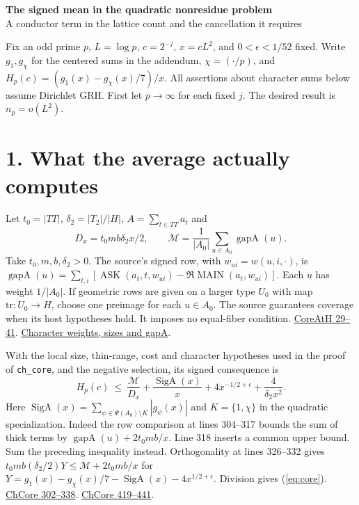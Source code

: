 \documentclass[11pt]{article}
\newcommand{\base}{https://github.com/Deicyde/riemann-hypothesis/blob/e7c8972c701d3396947808ab20cc16dc14623d33/src/}
\newcommand{\pin}[3]{\href{\base#1.lean\##2}{#3}}
\newcommand{\landdir}{Development/AutomorphicArithmetic/DedekindLFunctions/LandauTheorems/}
\newcommand{\gap}{\operatorname{gapA}}
\newcommand{\Sig}{\operatorname{SigA}}
\newcommand{\Ask}{\operatorname{ASK}}
\newcommand{\Main}{\operatorname{MAIN}}
\begin{document}
{\Large\bfseries The signed mean in the quadratic nonresidue problem}\\[3pt]
{\large A conductor term in the lattice count and the cancellation it requires}

Fix an odd prime $p$, $L=\log p$, $c=2^{-j}$, $x=cL^2$, and $0<\epsilon<1/52$ fixed.
Write $g_1,g_{\chi}$ for the centered sums in the addendum, $\chi=(\cdot/p)$, and
$H_p(c)=(g_1(x)-g_{\chi}(x)/7)/x$.
All assertions about character sums below assume Dirichlet GRH.
First let $p\to\infty$ for each fixed $j$. The desired result is $n_p=o(L^2)$.

\section*{1. What the average actually computes}
Let $t_0=|TT|$, $\delta_2=|T_2|/|H|$, $A=\sum_{t\in TT}a_t$ and
\[
 D_x=t_0mb\delta_2 x/2,\qquad
 \mathcal M=\frac{1}{|A_0|}\sum_{u\in A_0}\gap(u).
\]
Take $t_0,m,b,\delta_2>0$. The source's signed row, with $w_{ui}=w(u,i,\cdot)$, is
$\gap(u)=\sum_{t,i}[\Ask(a_t,t,w_{ui})-\Re\Main(a_t,w_{ui})]$.
Each $u$ has weight $1/|A_0|$. If geometric rows are given on a larger type $U_0$
with map $\mathrm{tr}:U_0\to H$, choose one preimage for each $u\in A_0$.
The source guarantees coverage when its host hypotheses hold. It imposes no equal-fiber condition.
\pin{Development/AutomorphicArithmetic/PrimitiveCosets/CoreAtH}{L29-L41}{CoreAtH 29--41}.
\pin{Development/AutomorphicArithmetic/DedekindLFunctions/SplitInertia}{L26-L52}{Character weights, sizes and gapA}.

With the local size, thin-range, cost and character hypotheses used in the proof of
\texttt{ch\_core}, and the negative selection, its signed consequence is
\begin{equation}
 H_p(c)\ \le\ \frac{\mathcal M}{D_x}+\frac{\Sig(x)}{x}
                 +4x^{-1/2+\epsilon}+\frac{4}{\delta_2 x^2}.
 \label{eq:core}
\end{equation}
Here $\Sig(x)=\sum_{\psi\in\Psi(A_0)\setminus K}|g_\psi(x)|$ and $K=\{1,\chi\}$ in the quadratic specialization. Indeed the row comparison at lines 304--317 bounds the sum of thick terms by $\gap(u)+2t_0mb/x$.
Line 318 inserts a common upper bound. Sum the preceding inequality instead.
Orthogonality at lines 326--332 gives $t_0mb(\delta_2/2)Y\le\mathcal M+2t_0mb/x$ for $Y= g_1(x)-g_\chi(x)/7-\Sig(x)-4x^{1/2+\epsilon}$. Division gives (\ref{eq:core}).
\pin{\landdir ChCore}{L302-L338}{ChCore 302--338}.
\pin{\landdir ChCore}{L419-L441}{ChCore 419--441}.
\end{document}
